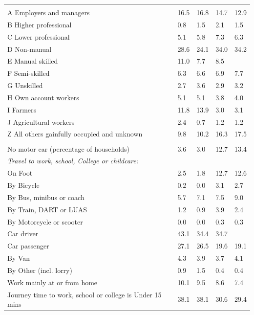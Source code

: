 \documentclass{article}
\begin{document}
\begin{table}[h]
\begin{tabular}{KTTTT}
\hline
    \\ 
    \hline
A Employers and managers & 16.5& 16.8& 14.7& 12.9\\
B Higher professional & 0.8& 1.5& 2.1& 1.5\\
C Lower professional & 5.1& 5.8& 7.3& 6.3\\
D Non-manual & 28.6& 24.1& 34.0& 34.2\\
E Manual skilled & 11.0&  7.7&  8.5\\
F Semi-skilled & 6.3& 6.6& 6.9& 7.7\\
G Unskilled & 2.7& 3.6& 2.9& 3.2\\
H Own account workers & 5.1& 5.1& 3.8& 4.0\\
I Farmers & 11.8& 13.9&  3.0&  3.1\\
J Agricultural workers & 2.4& 0.7& 1.2& 1.2\\
Z All others gainfully occupied and unknown &  9.8& 10.2& 16.3& 17.5\\
\hline
{}\hline
    \\ 
    \hline
No motor car (percentage of households) &  3.6&  3.0& 12.7& 
13.4\\
    \hline
\emph{Travel to work, school, College or childcare:} & & & \\
\quad On Foot &  2.5&  1.8& 12.7& 12.6\\
\quad By Bicycle & 0.2& 0.0& 3.1& 2.7\\
\quad By Bus, minibus or coach & 5.7& 7.1& 7.5& 9.0\\
\quad By Train, DART or LUAS & 1.2& 0.9& 3.9& 2.4\\
\quad By Motorcycle or scooter & 0.0& 0.0& 0.3& 0.3\\
\quad Car driver & 43.1& 34.4& 34.7\\
\quad Car passenger & 27.1& 26.5& 19.6& 19.1\\
\quad By Van & 4.3& 3.9& 3.7& 4.1\\
\quad By Other (incl. lorry) & 0.9& 1.5& 0.4& 0.4\\
    \hline
Work mainly at or from home & 10.1&  9.5&  8.6&  7.4\\
Journey time to work, school or college is Under 15 mins & 38.1& 38.1& 30.6& 29.4\\

\end{tabular}
\end{table}
\end{document}
